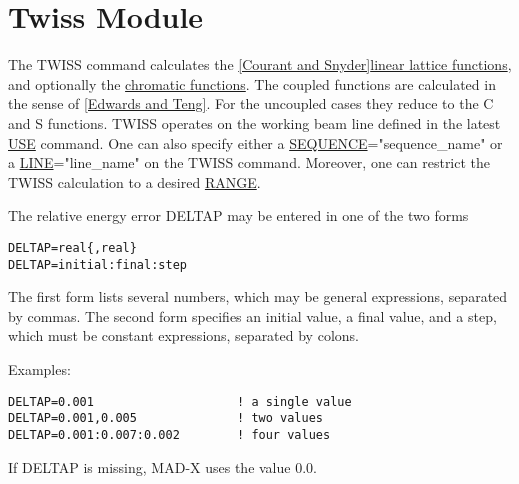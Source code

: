 

\chapter{Twiss Module}


The TWISS command calculates the
\href{../Introduction/bibliography.html#courant}{[Courant and
    Snyder]}\href{../Introduction/tables.html#linear}{linear lattice
  functions}, and optionally the
\href{../Introduction/tables.html#chrom}{chromatic functions}. The
coupled functions are calculated in the sense of
\href{../Introduction/bibliography.html#edwards}{[Edwards and
    Teng]}. For the uncoupled cases they reduce to the C and S
functions. TWISS operates on the working beam line defined in the latest
\href{../control/general.html#use}{USE} command. One can also specify
either a \href{../Introduction/sequence.html}{SEQUENCE}="sequence\_name"
or a \href{../Introduction/line.html}{LINE}="line\_name" on the TWISS
command. Moreover, one can restrict the TWISS calculation to a desired
\href{../Introduction/ranges.html#range}{RANGE}.  

The relative energy error DELTAP may be entered in one of the two forms
\begin{verbatim}
DELTAP=real{,real}
DELTAP=initial:final:step
\end{verbatim} 

The first form lists several numbers, which may be general expressions,
separated by commas. The second form specifies an initial value, a final
value, and a step, which must be constant expressions, separated by
colons.  

Examples: 
\begin{verbatim}
DELTAP=0.001                    ! a single value
DELTAP=0.001,0.005              ! two values
DELTAP=0.001:0.007:0.002        ! four values
\end{verbatim}

If DELTAP is missing, MAD-X uses the value 0.0. 

